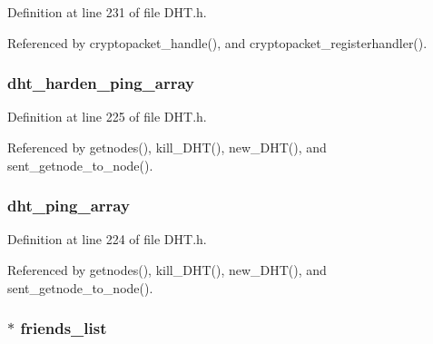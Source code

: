 Definition at line 231 of file D\+H\+T.\+h.



Referenced by cryptopacket\+\_\+handle(), and cryptopacket\+\_\+registerhandler().

\hypertarget{struct_d_h_t_a957126e184a8b8001228effc56b9db95}{
\subsubsection[{dht\+\_\+harden\+\_\+ping\+\_\+array}]{ dht\+\_\+harden\+\_\+ping\+\_\+array}}\label{struct_d_h_t_a957126e184a8b8001228effc56b9db95}


Definition at line 225 of file D\+H\+T.\+h.



Referenced by getnodes(), kill\+\_\+\+D\+H\+T(), new\+\_\+\+D\+H\+T(), and sent\+\_\+getnode\+\_\+to\+\_\+node().

\hypertarget{struct_d_h_t_a8432234ba71a00ac9c516cb80a70f29d}{
\subsubsection[{dht\+\_\+ping\+\_\+array}]{ dht\+\_\+ping\+\_\+array}}\label{struct_d_h_t_a8432234ba71a00ac9c516cb80a70f29d}


Definition at line 224 of file D\+H\+T.\+h.



Referenced by getnodes(), kill\+\_\+\+D\+H\+T(), new\+\_\+\+D\+H\+T(), and sent\+\_\+getnode\+\_\+to\+\_\+node().

\hypertarget{struct_d_h_t_ae97c6b057d770e7c4f3905cbe33b188b}{
\subsubsection[{friends\+\_\+list}]{$\ast$ friends\+\_\+list}}\label{struct_d_h_t_ae97c6b057d770e7c4f3905cbe33b188b}



